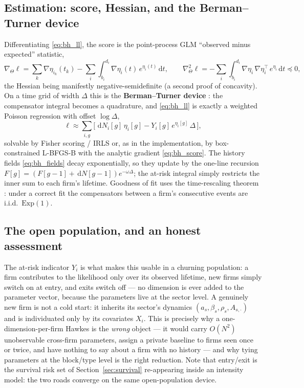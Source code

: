 \documentclass[11pt]{article}
\theoremstyle{plain}
\theoremstyle{definition}
\theoremstyle{remark}
\newcommand{\dd}{\,\mathrm{d}}
\begin{document}
\subsection{Estimation: score, Hessian, and the Berman--Turner device}
Differentiating \eqref{eq:bh_ll}, the score is the point-process GLM ``observed minus expected'' statistic,
\begin{equation}
\nabla_\Theta\ell=\sum_{k}\nabla\eta_{i_k}(t_k)-\sum_i\int_{b_i}^{d_i}\nabla\eta_i(t)\,e^{\eta_i(t)}\dd t,
\qquad
\nabla^2_\Theta\ell=-\sum_i\int_{b_i}^{d_i}\nabla\eta_i\,\nabla\eta_i^\top\,e^{\eta_i}\dd t\preceq0,
\label{eq:bh_score}
\end{equation}
the Hessian being manifestly negative-semidefinite (a second proof of concavity). On a time grid of width $\Delta$ this is the \textbf{Berman--Turner device} \citep{bermanturner1992}: the compensator integral becomes a quadrature, and \eqref{eq:bh_ll} is exactly a weighted Poisson regression with offset $\log\Delta$,
\begin{equation}
\ell\approx\sum_{i,g}\Big[\,\dd N_i[g]\,\eta_i[g]-Y_i[g]\,e^{\eta_i[g]}\,\Delta\,\Big],
\label{eq:bh_grid}
\end{equation}
solvable by Fisher scoring / IRLS or, as in the implementation, by box-constrained L-BFGS-B with the analytic gradient \eqref{eq:bh_score}. The history fields \eqref{eq:bh_fields} decay exponentially, so they update by the one-line recursion $F[g]=(F[g-1]+\dd N[g-1])e^{-\omega\Delta}$; the at-risk integral simply restricts the inner sum to each firm's lifetime. Goodness of fit uses the time-rescaling theorem \citep{ogata1988,ogata1981}: under a correct fit the compensators between a firm's consecutive events are i.i.d.\ $\mathrm{Exp}(1)$.

\subsection{The open population, and an honest assessment}
The at-risk indicator $Y_i$ is what makes this usable in a churning population: a firm contributes to the likelihood only over its observed lifetime, new firms simply switch on at entry, and exits switch off --- no dimension is ever added to the parameter vector, because the parameters live at the sector level. A genuinely new firm is not a cold start: it inherits its sector's dynamics $(a_{s},\beta_{s},\rho_{s},A_{s,\cdot})$ and is individuated only by its covariates $X_i$. This is precisely why a one-dimension-per-firm Hawkes is the \emph{wrong} object --- it would carry $O(N^2)$ unobservable cross-firm parameters, assign a private baseline to firms seen once or twice, and have nothing to say about a firm with no history --- and why tying parameters at the block/type level is the right reduction. Note that entry/exit is the survival risk set of Section~\ref{sec:survival} re-appearing inside an intensity model: the two roads converge on the same open-population device.
\end{document}
